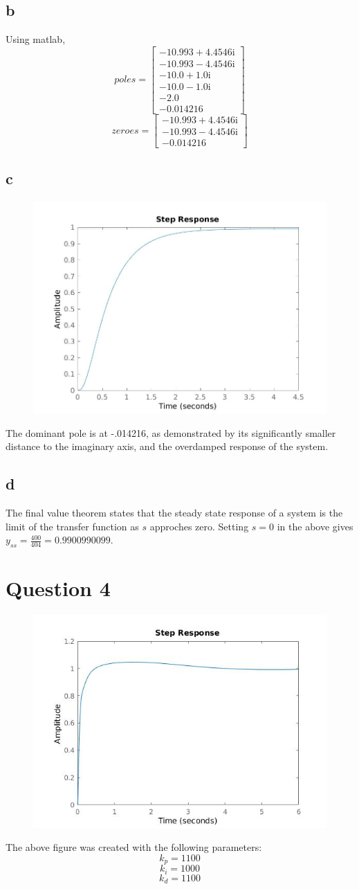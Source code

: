 \documentclass[11pt]{article}
\begin{document}
\subsection*{b}
Using matlab, 
$$
poles =\left[\begin{array}{c} -10.993+4.4546{}\mathrm{i}\\ -10.993-4.4546{}\mathrm{i}\\ -10.0+1.0{}\mathrm{i}\\ -10.0-1.0{}\mathrm{i}\\ -2.0\\ -0.014216 \end{array}\right]
$$
$$
zeroes = \left[\begin{array}{c} -10.993+4.4546{}\mathrm{i}\\ -10.993-4.4546{}\mathrm{i}\\ -0.014216 \end{array}\right]
$$
\subsection*{c}
\begin{figure}[H]
    \includegraphics[width=.7\textwidth]{q3.jpg}
\end{figure}
The dominant pole is at -.014216, as demonstrated by its significantly smaller distance to the 
imaginary axis, and the overdamped response of the system.
\subsection*{d}
The final value theorem states that the steady state response of a system is the limit of the 
transfer function as $s$ approches zero. Setting $s = 0$ in the above gives $y_{ss}=\frac{400}{404}=0.9900990099$.

\section*{Question 4}
\begin{figure}[H]
    \includegraphics[width=.7\textwidth]{q4.jpg}
\end{figure}
The above figure was created with the following parameters:
$$k_p = 1100$$
$$k_i = 1000$$
$$k_d = 1100$$
\end{document}
